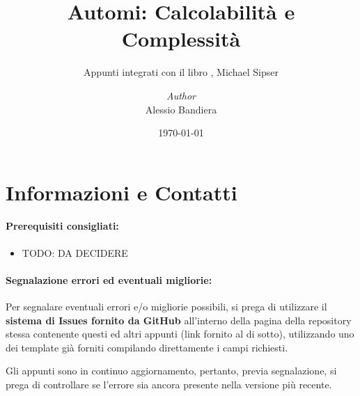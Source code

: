 \documentclass[a4paper, 12pt]{report}
\institute{\curlyquotes{\hspace{0.25mm}Sapienza} Università di Roma}
\title{Automi: Calcolabilità e Complessità}
\subtitle{Appunti integrati con il libro \curlyquotes{Introduzione alla teoria della computazione}, Michael Sipser}
\author{\textit{Author}\\Alessio Bandiera}
\date{\today}
\begin{document}
    \maketitle

    {
        \hypersetup{allcolors=black}

        \romantableofcontents
    }

    \chapter*{Informazioni e Contatti}      %
    
    \subsubsection{Prerequisiti consigliati:}
    \begin{itemize}
        \item TODO: DA DECIDERE
    \end{itemize}

    \quad

    \subsubsection{Segnalazione errori ed eventuali migliorie:}
    
    Per segnalare eventuali errori e/o migliorie possibili, si prega di utilizzare il \textbf{sistema di Issues fornito da GitHub} all'interno della pagina della repository stessa contenente questi ed altri appunti (link fornito al di sotto), utilizzando uno dei template già forniti compilando direttamente i campi richiesti.

    Gli appunti sono in continuo aggiornamento, pertanto, previa segnalazione, si prega di controllare se l'errore sia ancora presente nella versione più recente.
\end{document}
